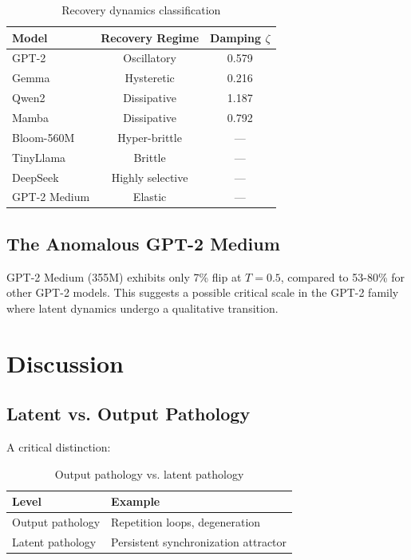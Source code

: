 \documentclass{article}
\begin{document}
\begin{table}[H]
\centering
\caption{Recovery dynamics classification}
\label{tab:recovery}
\begin{tabular}{lcc}
\toprule
Model & Recovery Regime & Damping $\zeta$ \\
\midrule
GPT-2 & Oscillatory & 0.579 \\
Gemma & Hysteretic & 0.216 \\
Qwen2 & Dissipative & 1.187 \\
Mamba & Dissipative & 0.792 \\
Bloom-560M & Hyper-brittle & — \\
TinyLlama & Brittle & — \\
DeepSeek & Highly selective & — \\
GPT-2 Medium & Elastic & — \\
\bottomrule
\end{tabular}
\end{table}

\subsection{The Anomalous GPT-2 Medium}

GPT-2 Medium (355M) exhibits only 7\% flip at $T=0.5$, compared to 53-80\% for other GPT-2 models. This suggests a possible critical scale in the GPT-2 family where latent dynamics undergo a qualitative transition.

\section{Discussion}

\subsection{Latent vs. Output Pathology}

A critical distinction:

\begin{table}[H]
\centering
\caption{Output pathology vs. latent pathology}
\label{tab:pathology}
\begin{tabular}{ll}
\toprule
Level & Example \\
\midrule
Output pathology & Repetition loops, degeneration \\
Latent pathology & Persistent synchronization attractor \\
\bottomrule
\end{tabular}
\end{table}
\end{document}
